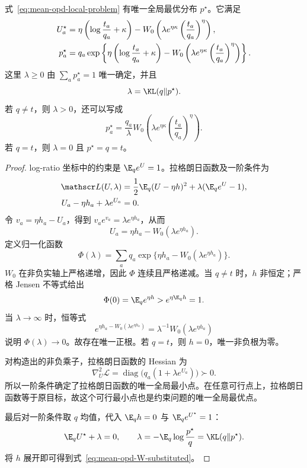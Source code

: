 \begin{theorem}
\label{thm:mean-opd-explicit}
式~\eqref{eq:mean-opd-local-problem} 有唯一全局最优分布 $p^\star$。它满足
\begin{align}
 U_a^\star
 &=\eta\left(\log\frac{t_a}{q_a}+\kappa\right)
   -W_0\left(\lambda e^{\eta\kappa}
                      \left(\frac{t_a}{q_a}\right)^\eta\right),\notag\\
 p_a^\star
 &=q_a\exp\left\{\eta\left(\log\frac{t_a}{q_a}+\kappa\right)
   -W_0\left(\lambda e^{\eta\kappa}
                      \left(\frac{t_a}{q_a}\right)^\eta\right)\right\}.
 \label{eq:mean-opd-W-substituted}
\end{align}
这里 $\lambda\ge0$ 由 $\sum_a p_a^\star=1$ 唯一确定，并且
\begin{equation}
 \lambda=\KL(q\Vert p^\star).
 \label{eq:mean-opd-multiplier-kl}
\end{equation}
若 $q\ne t$，则 $\lambda>0$，还可以写成
\begin{equation}
 p_a^\star=\frac{q_a}{\lambda}
 W_0\left(\lambda e^{\eta\kappa}
                \left(\frac{t_a}{q_a}\right)^\eta\right).
 \label{eq:mean-opd-W-ratio}
\end{equation}
若 $q=t$，则 $\lambda=0$ 且 $p^\star=q=t$。
\end{theorem}

\begin{proof}
log-ratio 坐标中的约束是 $\E_qe^U=1$。拉格朗日函数及一阶条件为
\begin{align*}
 \mathscr L(U,\lambda)
 &=\frac12\E_q(U-\eta h)^2+\lambda(\E_qe^U-1),\\
 U_a-\eta h_a+\lambda e^{U_a}&=0.
\end{align*}
令 $v_a=\eta h_a-U_a$，得到 $v_ae^{v_a}=\lambda e^{\eta h_a}$，从而
\[
 U_a=\eta h_a-W_0(\lambda e^{\eta h_a}).
\]
定义归一化函数
\[
 \Phi(\lambda)=\sum_aq_a
 \exp\{\eta h_a-W_0(\lambda e^{\eta h_a})\}.
\]
$W_0$ 在非负实轴上严格递增，因此 $\Phi$ 连续且严格递减。当 $q\ne t$ 时，$h$ 非恒定；严格 Jensen 不等式给出
\[
 \Phi(0)=\E_qe^{\eta h}>e^{\eta\E_qh}=1.
\]
当 $\lambda\to\infty$ 时，恒等式
\[
 e^{\eta h_a-W_0(\lambda e^{\eta h_a})}
 =\lambda^{-1}W_0(\lambda e^{\eta h_a})
\]
说明 $\Phi(\lambda)\to0$。故存在唯一正根。若 $q=t$，则 $h=0$，唯一非负根为零。

对构造出的非负乘子，拉格朗日函数的 Hessian 为
\[
 \nabla_U^2\mathscr L
 =\operatorname{diag}\bigl(q_a(1+\lambda e^{U_a})\bigr)\succ0.
\]
所以一阶条件确定了拉格朗日函数的唯一全局最小点。在任意可行点上，拉格朗日函数等于原目标，故这个可行最小点也是约束问题的唯一全局最优点。

最后对一阶条件取 $q$ 均值，代入 $\E_qh=0$ 与 $\E_qe^{U^\star}=1$：
\[
 \E_qU^\star+\lambda=0,
 \qquad
 \lambda=-\E_q\log\frac{p^\star}{q}=\KL(q\Vert p^\star).
\]
将 $h$ 展开即可得到式~\eqref{eq:mean-opd-W-substituted}。
\end{proof}

